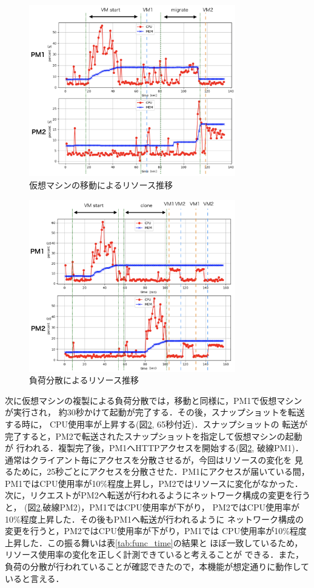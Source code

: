 \documentclass[a4paper, twocolumn]{jarticle}
\begin{document}
\begin{figure}[t]
	\includegraphics[width=9.0cm]{fig/migrate.png}
	\caption{仮想マシンの移動によるリソース推移}
	\label{fig:graph_migrate}
\end{figure}

\begin{figure}[t]
	\includegraphics[width=9.0cm]{fig/clone.png}
	\caption{負荷分散によるリソース推移}
	\label{fig:graph_clone}
\end{figure}

次に仮想マシンの複製による負荷分散では，移動と同様に，PM1で仮想マシンが実行され，
約30秒かけて起動が完了する．その後，スナップショットを転送する時に，
CPU使用率が上昇する(図\ref{fig:graph_clone}, 65秒付近)．スナップショットの
転送が完了すると，PM2で転送されたスナップショットを指定して仮想マシンの起動が
行われる．複製完了後，PM1へHTTPアクセスを開始する(図\ref{fig:graph_clone},
破線PM1)．通常はクライアント毎にアクセスを分散させるが，今回はリソースの変化を
見るために，25秒ごとにアクセスを分散させた．PM1にアクセスが届いている間，
PM1ではCPU使用率が10\%程度上昇し，PM2ではリソースに変化がなかった．
次に，リクエストがPM2へ転送が行われるようにネットワーク構成の変更を行うと，
(図\ref{fig:graph_clone},破線PM2)，PM1ではCPU使用率が下がり，
PM2ではCPU使用率が10\%程度上昇した．その後もPM1へ転送が行われるように
ネットワーク構成の変更を行うと，PM2ではCPU使用率が下がり，PM1では
CPU使用率が10\%程度上昇した．この振る舞いは表\ref{tab:func_time}の結果と
ほぼ一致しているため，リソース使用率の変化を正しく計測できていると考えることが
できる．また，負荷の分散が行われていることが確認できたので，本機能が想定通りに動作していると言える．
\end{document}
